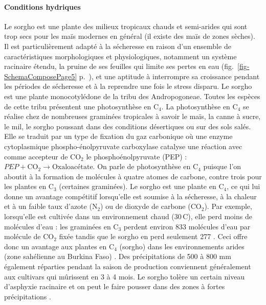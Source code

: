 \documentclass[a4paper,11pt]{article}
\begin{document}
\paragraph{Conditions hydriques} Le sorgho est une plante des milieux
tropicaux chauds et semi-arides qui sont trop secs pour les maïs
modernes en général (il existe des maïs de zones sèches). Il est
particulièrement adapté à la sécheresse en raison d'un ensemble de
caractéristiques morphologiques et physiologiques, notamment un
système racinaire étendu, la pruine de ses feuilles qui limite ses
pertes en eau (fig.~\ref{fig-SchemaComposePage5}
p.~\pageref{fig-SchemaComposePage5}), et une aptitude à interrompre sa
croissance pendant les périodes de sécheresse et à la reprendre une
fois le stress disparu. Le sorgho est une plante monocotylédone de la
tribu des Andropogoneae. Toutes les espèces de cette tribu présentent
une photosynthèse en $\text{C}_4$. La photosynthèse en $\text{C}_4$ se
réalise chez de nombreuses graminées tropicales à savoir le maïs, la
canne à sucre, le mil, le sorgho poussant dans des conditions
désertiques ou sur des sols salés. Elle se traduit par un type de
fixation du gaz carbonique où une enzyme cytoplasmique
phospho-énolpyruvate carboxylase catalyse une réaction avec comme
accepteur de $\text{CO}_2$ le phosphoénolpyruvate (PEP) :
$PEP + \text{CO}_2 \longrightarrow \text{Oxaloacétate}$. On parle de
photosynthèse en $\text{C}_4$ puisque l'on aboutit à la formation de
molécules à quatre atomes de carbone, contre trois pour les plantes en
$\text{C}_3$ (certaines graminées). Le sorgho est une plante en
$\text{C}_4$, ce qui lui donne un avantage compétitif lorsqu'elle est
soumise à la sécheresse, à la chaleur et à un faible taux d'azote
($\text{N}_2$) ou de dioxyde de carbone ($\text{CO}_2$). Par exemple,
lorsqu'elle est cultivée dans un environnement chaud (30\,\degree{}C),
elle perd moins de molécules d'eau : les graminées en $\text{C}_3$
perdent environ 833 molécules d'eau par molécule de $\text{CO}_2$
fixée tandis que le sorgho en perd seulement 277
\cite{sage1998c4}. Ceci offre donc un avantage aux plantes en
$\text{C}_4$ (sorgho) dans les environnements arides (zone sahélienne
au Burkina Faso) \cite{sage1998c4}. Des précipitations de 500 à 800 mm
également réparties pendant la saison de production conviennent
généralement aux cultivars qui mûrissent en 3 à 4 mois. Le sorgho
tolère un certain niveau d'asphyxie racinaire et on peut le faire
pousser dans des zones à fortes précipitations
\cite{BARRO_KONDOMBO_2010}.
\end{document}
